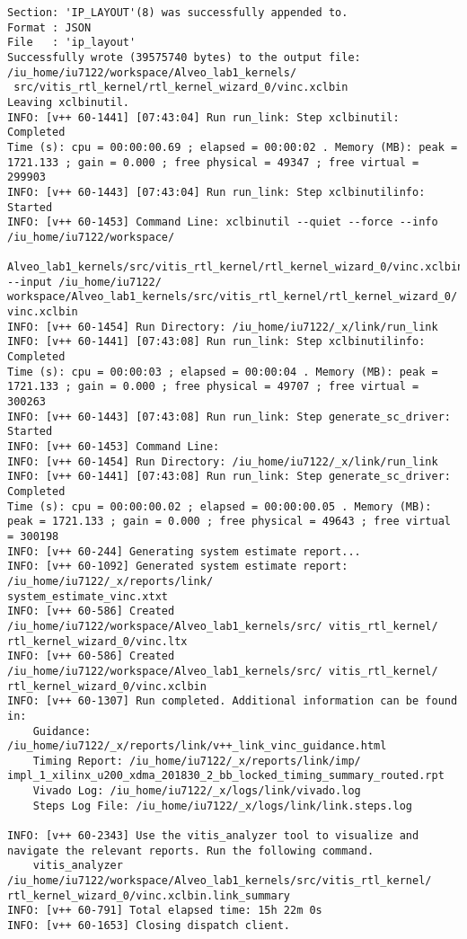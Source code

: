\begin{lstlisting}[label=some-code-2,caption=Содержимое файла v++\_vinc.log]
Section: 'IP_LAYOUT'(8) was successfully appended to.
Format : JSON
File   : 'ip_layout'
Successfully wrote (39575740 bytes) to the output file: /iu_home/iu7122/workspace/Alveo_lab1_kernels/
 src/vitis_rtl_kernel/rtl_kernel_wizard_0/vinc.xclbin
Leaving xclbinutil.
INFO: [v++ 60-1441] [07:43:04] Run run_link: Step xclbinutil: Completed
Time (s): cpu = 00:00:00.69 ; elapsed = 00:00:02 . Memory (MB): peak = 1721.133 ; gain = 0.000 ; free physical = 49347 ; free virtual = 299903
INFO: [v++ 60-1443] [07:43:04] Run run_link: Step xclbinutilinfo: Started
INFO: [v++ 60-1453] Command Line: xclbinutil --quiet --force --info /iu_home/iu7122/workspace/
 Alveo_lab1_kernels/src/vitis_rtl_kernel/rtl_kernel_wizard_0/vinc.xclbin.info --input /iu_home/iu7122/
workspace/Alveo_lab1_kernels/src/vitis_rtl_kernel/rtl_kernel_wizard_0/ vinc.xclbin
INFO: [v++ 60-1454] Run Directory: /iu_home/iu7122/_x/link/run_link
INFO: [v++ 60-1441] [07:43:08] Run run_link: Step xclbinutilinfo: Completed
Time (s): cpu = 00:00:03 ; elapsed = 00:00:04 . Memory (MB): peak = 1721.133 ; gain = 0.000 ; free physical = 49707 ; free virtual = 300263
INFO: [v++ 60-1443] [07:43:08] Run run_link: Step generate_sc_driver: Started
INFO: [v++ 60-1453] Command Line: 
INFO: [v++ 60-1454] Run Directory: /iu_home/iu7122/_x/link/run_link
INFO: [v++ 60-1441] [07:43:08] Run run_link: Step generate_sc_driver: Completed
Time (s): cpu = 00:00:00.02 ; elapsed = 00:00:00.05 . Memory (MB): peak = 1721.133 ; gain = 0.000 ; free physical = 49643 ; free virtual = 300198
INFO: [v++ 60-244] Generating system estimate report...
INFO: [v++ 60-1092] Generated system estimate report: /iu_home/iu7122/_x/reports/link/
system_estimate_vinc.xtxt
INFO: [v++ 60-586] Created /iu_home/iu7122/workspace/Alveo_lab1_kernels/src/ vitis_rtl_kernel/
rtl_kernel_wizard_0/vinc.ltx
INFO: [v++ 60-586] Created /iu_home/iu7122/workspace/Alveo_lab1_kernels/src/ vitis_rtl_kernel/
rtl_kernel_wizard_0/vinc.xclbin
INFO: [v++ 60-1307] Run completed. Additional information can be found in:
	Guidance: /iu_home/iu7122/_x/reports/link/v++_link_vinc_guidance.html
	Timing Report: /iu_home/iu7122/_x/reports/link/imp/
impl_1_xilinx_u200_xdma_201830_2_bb_locked_timing_summary_routed.rpt
	Vivado Log: /iu_home/iu7122/_x/logs/link/vivado.log
	Steps Log File: /iu_home/iu7122/_x/logs/link/link.steps.log

INFO: [v++ 60-2343] Use the vitis_analyzer tool to visualize and navigate the relevant reports. Run the following command. 
    vitis_analyzer /iu_home/iu7122/workspace/Alveo_lab1_kernels/src/vitis_rtl_kernel/ rtl_kernel_wizard_0/vinc.xclbin.link_summary 
INFO: [v++ 60-791] Total elapsed time: 15h 22m 0s
INFO: [v++ 60-1653] Closing dispatch client.
\end{lstlisting}

